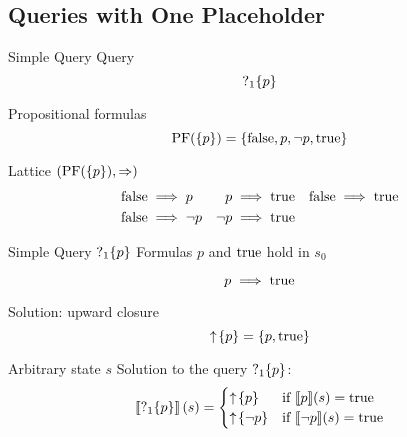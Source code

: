\subsection[One Placeholder]{Queries with One Placeholder}

\begin{frame}{Simple Query}
  Query  
  \[ \operatorname{?}_1\{p\} \]

  \vfill

  Propositional formulas
  \[ \operatorname{PF}(\{p\}) = \{\operatorname{false}, p, \lnot p, \operatorname{true}\} \]
\end{frame}

\begin{frame}{Lattice $(\operatorname{PF}(\{p\}),\Rightarrow)$}
  \begin{align*}
    \operatorname{false} &\implies p & p &\implies \operatorname{true} & \operatorname{false} &\implies \operatorname{true} \\
    \operatorname{false} &\implies \lnot p & \lnot p &\implies \operatorname{true} & & 
  \end{align*}

  \pause
  
  \begin{center}
  \end{center}
\end{frame}

\begin{frame}{Simple Query $\operatorname{?}_1\{p\}$}
  Formulas $p$ and $\operatorname{true}$ hold in $s_0$
  
  \[ p \implies \operatorname{true} \]
  
  Solution: upward closure 
  \[ \uparrow \! \left\{ p \right\} = \{ p, \operatorname{true}\} \]
\end{frame}

\begin{frame}{Arbitrary state $s$}
  Solution to the query $\operatorname{?}_1\{p\}$:
  \[ \left\llbracket \operatorname{?}_1\{p\} \right\rrbracket (s) = \begin{cases}
       \uparrow \! \left\{ p \right\} & \text{if } \llbracket p \rrbracket (s) = \operatorname{true} \\
       \uparrow \! \left\{ \lnot p \right\} & \text{if } \llbracket \lnot p \rrbracket (s) = \operatorname{true}
     \end{cases} 
  \]
\end{frame}

